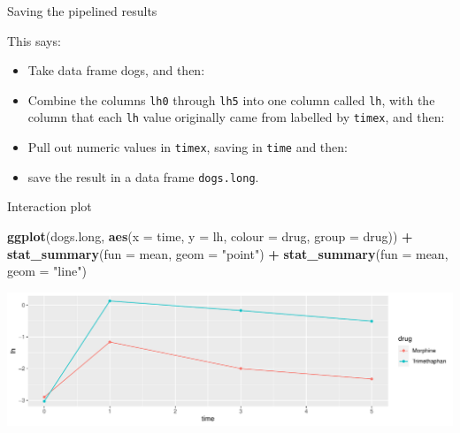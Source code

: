 \documentclass[
  ignorenonframetext,
]{beamer}
\newenvironment{Shaded}{\begin{snugshade}}{\end{snugshade}}
\newcommand{\DataTypeTok}[1]{\textcolor[rgb]{0.13,0.29,0.53}{#1}}
\newcommand{\KeywordTok}[1]{\textcolor[rgb]{0.13,0.29,0.53}{\textbf{#1}}}
\newcommand{\NormalTok}[1]{#1}
\newcommand{\OperatorTok}[1]{\textcolor[rgb]{0.81,0.36,0.00}{\textbf{#1}}}
\newcommand{\StringTok}[1]{\textcolor[rgb]{0.31,0.60,0.02}{#1}}
\begin{document}
\begin{frame}[fragile]{Saving the pipelined results}
\protect\hypertarget{saving-the-pipelined-results}{}

\begin{Shaded}
\end{Shaded}

This says:

\begin{itemize}
\item
  Take data frame dogs, and then:
\item
  Combine the columns \texttt{lh0} through \texttt{lh5} into one column
  called \texttt{lh}, with the column that each \texttt{lh} value
  originally came from labelled by \texttt{timex}, and then:
\item
  Pull out numeric values in \texttt{timex}, saving in \texttt{time} and
  then:
\item
  save the result in a data frame \texttt{dogs.long}.
\end{itemize}

\end{frame}

\begin{frame}[fragile]{Interaction plot}
\protect\hypertarget{interaction-plot-3}{}

\small

\begin{Shaded}
\begin{Highlighting}[]
\KeywordTok{ggplot}\NormalTok{(dogs.long, }\KeywordTok{aes}\NormalTok{(}\DataTypeTok{x =}\NormalTok{ time, }\DataTypeTok{y =}\NormalTok{ lh, }
                      \DataTypeTok{colour =}\NormalTok{ drug, }\DataTypeTok{group =}\NormalTok{ drug)) }\OperatorTok{+}
\StringTok{  }\KeywordTok{stat_summary}\NormalTok{(}\DataTypeTok{fun =}\NormalTok{ mean, }\DataTypeTok{geom =} \StringTok{"point"}\NormalTok{) }\OperatorTok{+}
\StringTok{  }\KeywordTok{stat_summary}\NormalTok{(}\DataTypeTok{fun =}\NormalTok{ mean, }\DataTypeTok{geom =} \StringTok{"line"}\NormalTok{)}
\end{Highlighting}
\end{Shaded}

\includegraphics{slides_d29_files/figure-beamer/unnamed-chunk-279-1.pdf}
\normalsize

\end{frame}
\end{document}
